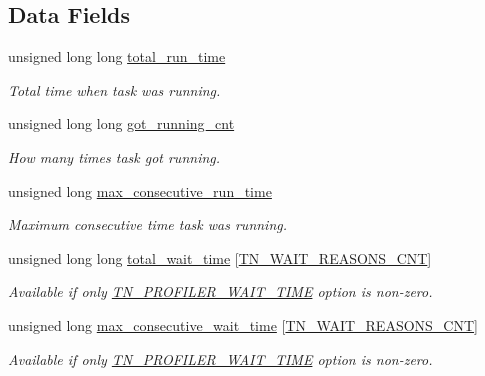 \subsection*{Data Fields}
\begin{DoxyCompactItemize}
\item 
unsigned long long \hyperlink{structTN__TaskTiming_a97964cfe380308698fffd730964f4d5c}{total\+\_\+run\+\_\+time}
\begin{DoxyCompactList}\small\item\em Total time when task was running. \end{DoxyCompactList}\item 
unsigned long long \hyperlink{structTN__TaskTiming_ad158c48fe2c596d914cab40c9a7838ae}{got\+\_\+running\+\_\+cnt}
\begin{DoxyCompactList}\small\item\em How many times task got running. \end{DoxyCompactList}\item 
\hypertarget{structTN__TaskTiming_af48cbd4118093e90b15b0b32134d949c}{unsigned long \hyperlink{structTN__TaskTiming_af48cbd4118093e90b15b0b32134d949c}{max\+\_\+consecutive\+\_\+run\+\_\+time}}\label{structTN__TaskTiming_af48cbd4118093e90b15b0b32134d949c}

\begin{DoxyCompactList}\small\item\em Maximum consecutive time task was running. \end{DoxyCompactList}\item 
unsigned long long \hyperlink{structTN__TaskTiming_a0832c998c39b3e8400ccbb386bfbc7d9}{total\+\_\+wait\+\_\+time} \mbox{[}\hyperlink{tn__tasks_8h_a343b0332013c15d6e878c2f60ed2c9b7a54de9b2b340a9d3f444aaeccda0764ea}{T\+N\+\_\+\+W\+A\+I\+T\+\_\+\+R\+E\+A\+S\+O\+N\+S\+\_\+\+C\+N\+T}\mbox{]}
\begin{DoxyCompactList}\small\item\em Available if only {\ttfamily \hyperlink{tn__cfg__default_8h_a1c04db5457adb54f7cc38d42b29a5ad7}{T\+N\+\_\+\+P\+R\+O\+F\+I\+L\+E\+R\+\_\+\+W\+A\+I\+T\+\_\+\+T\+I\+M\+E}} option is non-\/zero. \end{DoxyCompactList}\item 
unsigned long \hyperlink{structTN__TaskTiming_abb5335583d7c59aaca03753ee121c1bb}{max\+\_\+consecutive\+\_\+wait\+\_\+time} \mbox{[}\hyperlink{tn__tasks_8h_a343b0332013c15d6e878c2f60ed2c9b7a54de9b2b340a9d3f444aaeccda0764ea}{T\+N\+\_\+\+W\+A\+I\+T\+\_\+\+R\+E\+A\+S\+O\+N\+S\+\_\+\+C\+N\+T}\mbox{]}
\begin{DoxyCompactList}\small\item\em Available if only {\ttfamily \hyperlink{tn__cfg__default_8h_a1c04db5457adb54f7cc38d42b29a5ad7}{T\+N\+\_\+\+P\+R\+O\+F\+I\+L\+E\+R\+\_\+\+W\+A\+I\+T\+\_\+\+T\+I\+M\+E}} option is non-\/zero. \end{DoxyCompactList}\end{DoxyCompactItemize}


